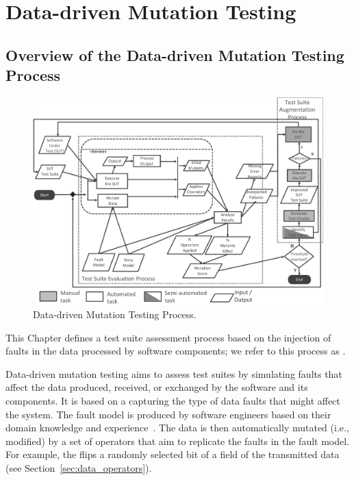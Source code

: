 
\chapter{Data-driven Mutation Testing}
\label{chapter:datamutation}


\section{Overview of the Data-driven Mutation Testing Process}
\label{sec:dataProcess}

	\begin{figure}
	\centering
		\includegraphics[width=\textwidth]{images/dataProcess}
		\caption{Data-driven Mutation Testing Process.}
		\label{fig:data:process}
	\end{figure}



This Chapter defines a test suite assessment process based on the injection of faults in the data processed by software components; we refer to this process as . 

Data-driven mutation testing aims to assess test suites by simulating faults that affect the data produced, received, or exchanged by the software and its components.
It is based on a  capturing the type of data faults that might affect the system. The fault model is produced by software engineers based on their domain knowledge and experience~\cite{di2015generating}.  The data is then automatically  mutated (i.e., modified) by a set of operators that aim to replicate the faults in the fault model. For example, the  flips a randomly selected bit of a field of the transmitted data (see Section~\ref{sec:data_operators}). 


